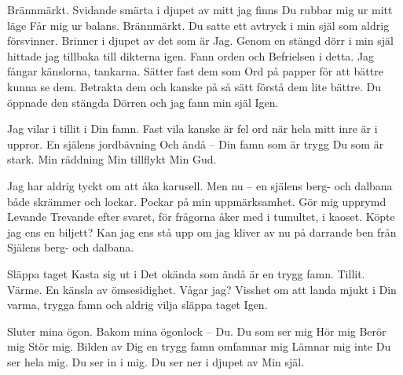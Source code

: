 Brännmärkt.
Svidande smärta i djupet av 
mitt jag
finns Du
rubbar mig ur mitt läge
Får mig ur balans.
Brännmärkt.
Du satte ett avtryck
i min själ som aldrig försvinner.
Brinner i djupet
av det som är 
Jag.
Genom en stängd dörr i min själ
hittade jag tillbaka till dikterna igen.
Fann orden och 
Befrielsen i detta.
Jag fångar känslorna, tankarna.
Sätter fast dem som 
Ord på papper
för att bättre kunna se dem.
Betrakta dem 
och kanske på så sätt förstå dem 
lite bättre.
Du öppnade den stängda Dörren
och jag fann min själ
Igen.
\stoppoem

\startpoem
Jag vilar i tillit i Din famn.
Fast vila kanske är fel ord
när  hela mitt inre är i uppror.
En själens jordbävning 
Och ändå – Din famn
som är trygg
Du som är stark.
Min räddning
Min tillflykt
Min Gud.
\stoppoem

\startpoem
Jag har aldrig tyckt om att åka karusell. 
Men nu – en själens berg- och dalbana
både skrämmer och lockar.
Pockar på min uppmärksamhet.
Gör mig upprymd
Levande
Trevande
efter svaret, för frågorna åker med
i tumultet, i kaoset.
Köpte jag ens en biljett?
Kan jag ens stå upp om jag kliver av nu
på darrande ben från
Själens berg- och dalbana.
\stoppoem

\startpoem
Släppa taget
Kasta sig ut i 
Det okända
som ändå är en trygg famn.
Tillit.
Värme.
En känsla av ömsesidighet.
Vågar jag?
Visshet om att landa mjukt
i Din varma, trygga famn
och aldrig vilja släppa taget
Igen. 
\stoppoem

\startpoem
Sluter mina ögon.
Bakom mina ögonlock – Du.
Du som ser mig
Hör mig
Berör mig
Stör mig.
Bilden av Dig
en trygg famn omfamnar mig
Lämnar mig inte
Du ser hela mig. 
Du ser in i mig.
Du ser ner i djupet av
Min själ.
\stoppoem

\bye